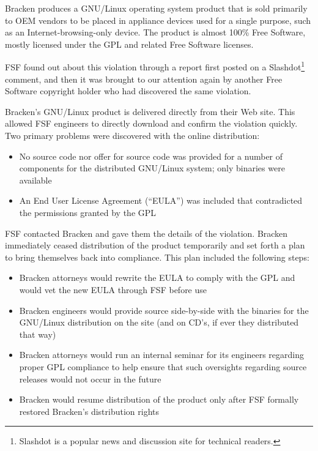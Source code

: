 Bracken produces a GNU/Linux operating system product that is sold
primarily to OEM vendors to be placed in appliance devices used for a
single purpose, such as an Internet-browsing-only device. The product
is almost 100\% Free Software, mostly licensed under the GPL and related
Free Software licenses.

FSF found out about this violation through a report first posted on a
  Slashdot\footnote{Slashdot is a popular news and discussion site for
  technical readers.} comment, and then it was brought to our attention again
  by another Free Software copyright holder who had discovered the
  same violation.

Bracken's GNU/Linux product is delivered directly from their Web site.
This allowed FSF engineers to directly download and confirm the
violation quickly. Two primary problems were discovered with the
online distribution:

\begin{itemize}

\item No source code nor offer for source code was provided for a number
  of components for the distributed GNU/Linux system; only binaries were
  available

\item An End User License Agreement (``EULA'') was included that
  contradicted the permissions granted by the GPL\@

\end{itemize}

FSF contacted Bracken and gave them the details of the violation. Bracken
immediately ceased distribution of the product temporarily and set forth
a plan to bring themselves back into compliance. This plan included the
following steps:

\begin{itemize}

\item Bracken attorneys would rewrite the EULA to comply with the GPL and
  would vet the new EULA through FSF before use

\item Bracken engineers would provide source side-by-side with the
  binaries for the GNU/Linux distribution on the site (and on CD's, if
  ever they distributed that way)

\item Bracken attorneys would run an internal seminar for its engineers
  regarding proper GPL compliance to help ensure that such oversights
  regarding source releases would not occur in the future

\item Bracken would resume distribution of the product only after FSF
  formally restored Bracken's distribution rights
\end{itemize}

